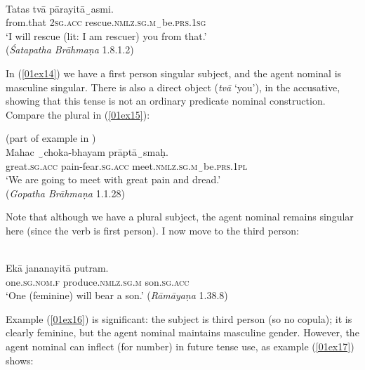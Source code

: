\documentclass[output=paper,colorlinks,citecolor=brown]{langscibook}
\begin{document}
\begin{exe}
	\ex {} \citep[112]{stump2013} \label{01ex14} \\
	\gll Tatas tvā pārayitā{\charis ‿}asmi. \\
	from.that	\textsc{2sg.acc} 	rescue.\textsc{nmlz.sg.m}{\charis ‿}be.\textsc{prs.1sg} \\
	\trans ‘I will rescue (lit: I am rescuer) you from that.’ \\
	\hfill (\textit{Śatapatha Brāhmaṇa} 1.8.1.2)
\end{exe}

In (\ref{01ex14}) we have a first person singular subject, and the agent nominal is masculine singular. There is also a direct object (\textit{tvā} `you'), in the accusative, showing that this tense is not an ordinary predicate nominal construction. Compare the plural in (\ref{01ex15}):

\begin{exe}
	\ex {} (part of example in \citealt[113]{stump2013}) \label{01ex15} \\
	\gll Mahac	{\charis ‿}choka-bhayam	prāptā{\charis ‿}smaḥ.\footnotemark \\
	great.\textsc{sg.acc}	pain-fear.\textsc{sg.acc}	meet.\textsc{nmlz.sg.m}{\charis ‿}be.\textsc{prs.1pl} \\
	\trans ‘We are going to meet with great pain and dread.’ \\
	\hfill (\textit{Gopatha Brāhmaṇa} 1.1.28)
	
\end{exe}

Note that although we have a plural subject, the agent nominal remains singular here (since the verb is first person). I now move to the third person:

\begin{exe}
	\ex {} \citep[113]{stump2013} \label{01ex16} \\
	\gll Ekā jananayitā putram. \\
	one.\textsc{sg.nom.f}	produce.\textsc{nmlz.sg.m}	son.\textsc{sg.acc} \\
	\trans ‘One (feminine) will bear a son.’ \hfill (\textit{Rāmāyaṇa} 1.38.8)
\end{exe}

Example (\ref{01ex16}) is significant: the subject is third person (so no copula); it is clearly feminine, but the agent nominal maintains masculine gender. However, the agent nominal can inflect (for number) in future tense use, as example (\ref{01ex17}) shows:
\end{document}
